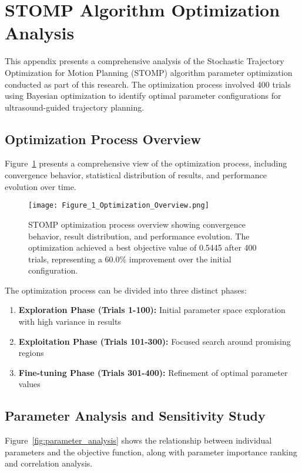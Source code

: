 \documentclass[12pt]{article}
\begin{document}
\appendix
\section{STOMP Algorithm Optimization Analysis}

This appendix presents a comprehensive analysis of the Stochastic Trajectory Optimization for Motion Planning (STOMP) algorithm parameter optimization conducted as part of this research. The optimization process involved 400 trials using Bayesian optimization to identify optimal parameter configurations for ultrasound-guided trajectory planning.

\subsection{Optimization Process Overview}

Figure~\ref{fig:optimization_overview} presents a comprehensive view of the optimization process, including convergence behavior, statistical distribution of results, and performance evolution over time.

\begin{figure}[H]
\centering
\texttt{[image: Figure\_1\_Optimization\_Overview.png]}
\caption{STOMP optimization process overview showing convergence behavior, result distribution, and performance evolution. The optimization achieved a best objective value of 0.5445 after 400 trials, representing a 60.0\% improvement over the initial configuration.}
\label{fig:optimization_overview}
\end{figure}

The optimization process can be divided into three distinct phases:
\begin{enumerate}
    \item \textbf{Exploration Phase (Trials 1-100):} Initial parameter space exploration with high variance in results
    \item \textbf{Exploitation Phase (Trials 101-300):} Focused search around promising regions
    \item \textbf{Fine-tuning Phase (Trials 301-400):} Refinement of optimal parameter values
\end{enumerate}

\subsection{Parameter Analysis and Sensitivity Study}

Figure~\ref{fig:parameter_analysis} shows the relationship between individual parameters and the objective function, along with parameter importance ranking and correlation analysis.
\end{document}
